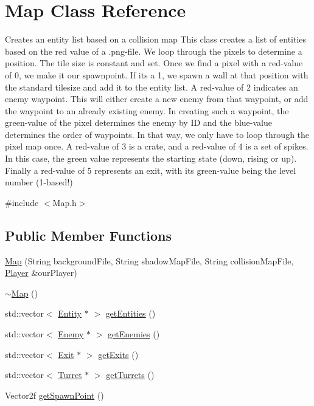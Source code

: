 \hypertarget{class_map}{}\section{Map Class Reference}
\label{class_map}


Creates an entity list based on a collision map This class creates a list of entities based on the red value of a .png-\/file. We loop through the pixels to determine a position. The tile size is constant and set. Once we find a pixel with a red-\/value of 0, we make it our spawnpoint. If it\textquotesingle{}s a 1, we spawn a wall at that position with the standard tilesize and add it to the entity list. A red-\/value of 2 indicates an enemy waypoint. This will either create a new enemy from that waypoint, or add the waypoint to an already existing enemy. In creating such a waypoint, the green-\/value of the pixel determines the enemy by ID and the blue-\/value determines the order of waypoints. In that way, we only have to loop through the pixel map once. A red-\/value of 3 is a crate, and a red-\/value of 4 is a set of spikes. In this case, the green value represents the starting state (down, rising or up). Finally a red-\/value of 5 represents an exit, with its green-\/value being the level number (1-\/based!)  




{\ttfamily \#include $<$Map.\+h$>$}

\subsection*{Public Member Functions}
\begin{DoxyCompactItemize}
\item 
\hyperlink{class_map_a1b9128df3f2c9aa5ff56130a3530e8a1}{Map} (String background\+File, String shadow\+Map\+File, String collision\+Map\+File, \hyperlink{class_player}{Player} \&our\+Player)
\item 
\hyperlink{class_map_aa403fbe09394ccf39747588f5168e3b2}{$\sim$\+Map} ()
\item 
std\+::vector$<$ \hyperlink{class_entity}{Entity} $\ast$ $>$ \hyperlink{class_map_a2321c241804c5ed69c0bc7d073f901fd}{get\+Entities} ()
\item 
std\+::vector$<$ \hyperlink{class_enemy}{Enemy} $\ast$ $>$ \hyperlink{class_map_a8796db77b21d899391c8163f3accf32c}{get\+Enemies} ()
\item 
std\+::vector$<$ \hyperlink{class_exit}{Exit} $\ast$ $>$ \hyperlink{class_map_a1c3f034c6072fe1103626cd9f5685094}{get\+Exits} ()
\item 
std\+::vector$<$ \hyperlink{class_turret}{Turret} $\ast$ $>$ \hyperlink{class_map_ab8f9839fd7d6e6838772cbad9cc9dc34}{get\+Turrets} ()
\item 
Vector2f \hyperlink{class_map_a15095789dcc043bbed23092f37447731}{get\+Spawn\+Point} ()
\end{DoxyCompactItemize}
